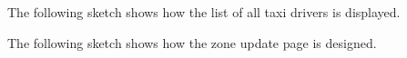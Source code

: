 The following sketch shows how the list of all taxi drivers is displayed.
\begin{figure}[H]
\centering
{}
\end{figure}

\pagebreak
The following sketch shows how the zone update page is designed. 
\begin{figure}[H]
\centering
{}
\end{figure}